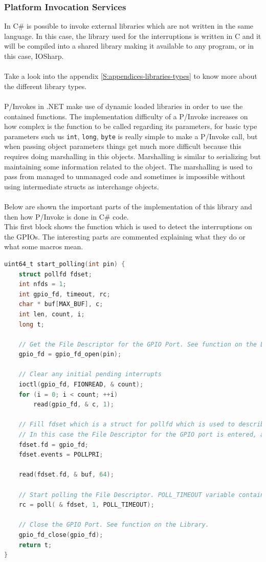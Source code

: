 \subsubsection{Platform Invocation Services}\label{SSS:IOSharp-Interrupt-PInvoke}
In C\# is possible to invoke external libraries which are not written in the same language. In this case, the library used for the interruptions is written in C and it will be compiled into a shared library making it available to any program, or in this case, IOSharp.
\\
\\
Take a look into the appendix \ref{S:appendices-libraries-types} to know more about the different library types.
\\
\\
P/Invokes in .NET make use of dynamic loaded libraries in order to use the contained functions. The implementation difficulty of a P/Invoke increases on how complex is the function to be called regarding its parameters, for basic type parameters such us \verb!int!, \verb!long!, \verb!byte! is really simple to make a P/Invoke call, but when passing object parameters things get much more difficult because this requires doing marshalling in this objects. Marshalling is similar to serializing but maintaining some information related to the object. The marshalling is used to pass from managed to unmanaged code and sometimes is impossible without using intermediate structs as interchange objects.
\\
\\
Below are shown the important parts of the implementation of this library and then how P/Invoke is done in C\# code.
\\
This first block shows the function which is used to detect the interruptions on the GPIOs. The interesting parts are commented explaining what they do or what some macros mean.
\begin{lstlisting}[language=C, caption={IOSharp.c - Polling function}]
uint64_t start_polling(int pin) {
    struct pollfd fdset;
    int nfds = 1;
    int gpio_fd, timeout, rc;
    char * buf[MAX_BUF], c;
    int len, count, i;
    long t;

    // Get the File Descriptor for the GPIO Port. See function on the Library.
    gpio_fd = gpio_fd_open(pin);

    // Clear any initial pending interrupts
    ioctl(gpio_fd, FIONREAD, & count);
    for (i = 0; i < count; ++i)
        read(gpio_fd, & c, 1);

    // Fill fdset which is a struct for pollfd which is used to describe the polling system.
    // In this case the File Descriptor for the GPIO port is entered, and then the POLLPRI (Data Urgent to Read) is configured as the event type.
    fdset.fd = gpio_fd;
    fdset.events = POLLPRI;

    read(fdset.fd, & buf, 64);

    // Start polling the File Descriptor. POLL_TIMEOUT variable contains (-1) which stands for infinite blocking until event.
    rc = poll( & fdset, 1, POLL_TIMEOUT);

    // Close the GPIO Port. See function on the Library.
    gpio_fd_close(gpio_fd);
    return t;
}
\end{lstlisting}
